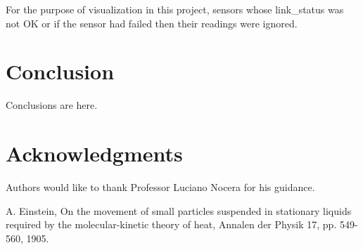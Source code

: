 \documentclass{llncs}
\begin{document}
 For the purpose of visualization in this project, sensors whose link\_status was not OK or if the sensor had failed then their readings were ignored. 

\section{Conclusion}\label{sec:Conclusion}

Conclusions are here.

\section*{Acknowledgments}\label{sec:Acknowledgments}

Authors would like to thank Professor Luciano Nocera for his guidance.

\begin{thebibliography}{1}

A. Einstein, On the movement of small particles suspended in stationary liquids required by the molecular-kinetic theory of heat, Annalen der Physik 17, pp. 549-560, 1905.

\end{thebibliography}
\end{document}
